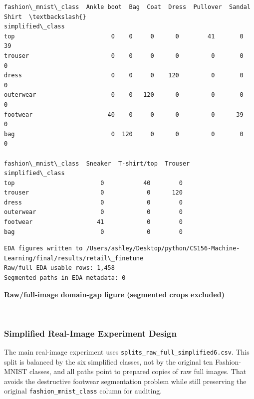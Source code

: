 \documentclass[11pt]{article}
\begin{document}
    \begin{Verbatim}[commandchars=\\\{\}]
fashion\_mnist\_class  Ankle boot  Bag  Coat  Dress  Pullover  Sandal  Shirt  \textbackslash{}
simplified\_class                                                             
top                           0    0     0      0        41       0     39   
trouser                       0    0     0      0         0       0      0   
dress                         0    0     0    120         0       0      0   
outerwear                     0    0   120      0         0       0      0   
footwear                     40    0     0      0         0      39      0   
bag                           0  120     0      0         0       0      0   

fashion\_mnist\_class  Sneaker  T-shirt/top  Trouser  
simplified\_class                                    
top                        0           40        0  
trouser                    0            0      120  
dress                      0            0        0  
outerwear                  0            0        0  
footwear                  41            0        0  
bag                        0            0        0  
    \end{Verbatim}

    
    \begin{Verbatim}[commandchars=\\\{\}]
EDA figures written to /Users/ashley/Desktop/python/CS156-Machine-
Learning/final/results/retail\_finetune
Raw/full EDA usable rows: 1,458
Segmented paths in EDA metadata: 0
    \end{Verbatim}

    \textbf{Raw/full-image domain-gap figure (segmented crops excluded)}

    
    \begin{center}
    \end{center}
    { \hspace*{\fill} \\}
    
    \subsubsection{Simplified Real-Image Experiment
Design}\label{simplified-real-image-experiment-design}

The main real-image experiment uses
\texttt{splits\_raw\_full\_simplified6.csv}. This split is balanced by
the six simplified classes, not by the original ten Fashion-MNIST
classes, and all paths point to prepared copies of raw full images. That
avoids the destructive footwear segmentation problem while still
preserving the original \texttt{fashion\_mnist\_class} column for
auditing.
\end{document}
